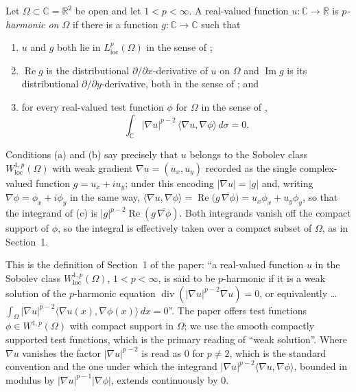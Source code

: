 \begin{definition}
Let $\Omega\subset\mathbb{C}=\mathbb{R}^2$ be open and let $1<p<\infty$.  A
real-valued function $u\colon\mathbb{C}\to\mathbb{R}$ is \emph{$p$-harmonic on
$\Omega$} if there is a function $g\colon\mathbb{C}\to\mathbb{C}$ such that
\begin{enumerate}
\item[(a)] $u$ and $g$ both lie in $L^p_{\mathrm{loc}}(\Omega)$ in the sense
of ;
\item[(b)] $\operatorname{Re}g$ is the distributional
$\partial/\partial x$-derivative of $u$ on $\Omega$ and $\operatorname{Im}g$
is its distributional $\partial/\partial y$-derivative, both in the sense of
; and
\item[(c)] for every real-valued test function $\phi$ for $\Omega$ in the
sense of ,
\[
  \int_{\mathbb{C}}|\nabla u|^{p-2}\,\langle\nabla u,\nabla\phi\rangle\,d\sigma=0 .
\]
\end{enumerate}
Conditions (a) and (b) say precisely that $u$ belongs to the Sobolev class
$W^{1,p}_{\mathrm{loc}}(\Omega)$ with weak gradient $\nabla u=(u_x,u_y)$
recorded as the single complex-valued function $g=u_x+iu_y$; under this
encoding $|\nabla u|=|g|$ and, writing $\nabla\phi=\phi_x+i\phi_y$ in the same
way, $\langle\nabla u,\nabla\phi\rangle=\operatorname{Re}\bigl(g\,
\overline{\nabla\phi}\bigr)=u_x\phi_x+u_y\phi_y$, so that the integrand of (c)
is $|g|^{p-2}\operatorname{Re}(g\,\overline{\nabla\phi})$.  Both integrands
vanish off the compact support of $\phi$, so the integral is effectively taken
over a compact subset of $\Omega$, as in Section~1.

This is the definition of Section~1 of the paper: ``a real-valued function $u$
in the Sobolev class $W^{1,p}_{\mathrm{loc}}(\Omega)$, $1<p<\infty$, is said to
be $p$-harmonic if it is a weak solution of the $p$-harmonic equation
$\operatorname{div}(|\nabla u|^{p-2}\nabla u)=0$, or equivalently \dots\
$\int_\Omega|\nabla u|^{p-2}\langle\nabla u(x),\nabla\phi(x)\rangle\,dx=0$''.
The paper offers test functions $\phi\in W^{1,p}(\Omega)$ with compact support
in $\Omega$; we use the smooth compactly supported test functions, which is
the primary reading of ``weak solution''.  Where $\nabla u$ vanishes the factor
$|\nabla u|^{p-2}$ is read as $0$ for $p\neq2$, which is the standard
convention and the one under which the integrand
$|\nabla u|^{p-2}\langle\nabla u,\nabla\phi\rangle$, bounded in modulus by
$|\nabla u|^{p-1}|\nabla\phi|$, extends continuously by $0$.
\end{definition}
